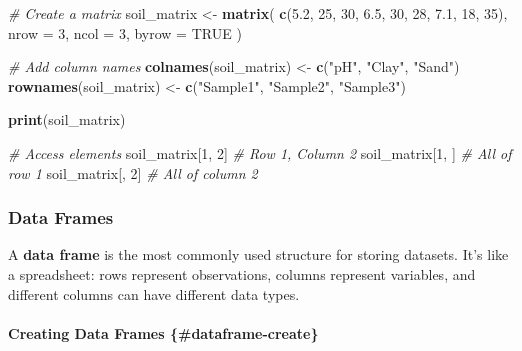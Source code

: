 \documentclass[
  10pt,
  b5paper,
  oneside]{book}
\newenvironment{Shaded}{\begin{snugshade}}{\end{snugshade}}
\newcommand{\AttributeTok}[1]{\textcolor[rgb]{0.13,0.29,0.53}{#1}}
\newcommand{\CommentTok}[1]{\textcolor[rgb]{0.56,0.35,0.01}{\textit{#1}}}
\newcommand{\ConstantTok}[1]{\textcolor[rgb]{0.56,0.35,0.01}{#1}}
\newcommand{\DecValTok}[1]{\textcolor[rgb]{0.00,0.00,0.81}{#1}}
\newcommand{\FloatTok}[1]{\textcolor[rgb]{0.00,0.00,0.81}{#1}}
\newcommand{\FunctionTok}[1]{\textcolor[rgb]{0.13,0.29,0.53}{\textbf{#1}}}
\newcommand{\NormalTok}[1]{#1}
\newcommand{\OtherTok}[1]{\textcolor[rgb]{0.56,0.35,0.01}{#1}}
\newcommand{\StringTok}[1]{\textcolor[rgb]{0.31,0.60,0.02}{#1}}
\begin{document}
\begin{Shaded}
\begin{Highlighting}[]
\CommentTok{\# Create a matrix}
\NormalTok{soil\_matrix }\OtherTok{\textless{}{-}} \FunctionTok{matrix}\NormalTok{(}
  \FunctionTok{c}\NormalTok{(}\FloatTok{5.2}\NormalTok{, }\DecValTok{25}\NormalTok{, }\DecValTok{30}\NormalTok{,}
    \FloatTok{6.5}\NormalTok{, }\DecValTok{30}\NormalTok{, }\DecValTok{28}\NormalTok{,}
    \FloatTok{7.1}\NormalTok{, }\DecValTok{18}\NormalTok{, }\DecValTok{35}\NormalTok{),}
  \AttributeTok{nrow =} \DecValTok{3}\NormalTok{,}
  \AttributeTok{ncol =} \DecValTok{3}\NormalTok{,}
  \AttributeTok{byrow =} \ConstantTok{TRUE}
\NormalTok{)}

\CommentTok{\# Add column names}
\FunctionTok{colnames}\NormalTok{(soil\_matrix) }\OtherTok{\textless{}{-}} \FunctionTok{c}\NormalTok{(}\StringTok{"pH"}\NormalTok{, }\StringTok{"Clay"}\NormalTok{, }\StringTok{"Sand"}\NormalTok{)}
\FunctionTok{rownames}\NormalTok{(soil\_matrix) }\OtherTok{\textless{}{-}} \FunctionTok{c}\NormalTok{(}\StringTok{"Sample1"}\NormalTok{, }\StringTok{"Sample2"}\NormalTok{, }\StringTok{"Sample3"}\NormalTok{)}

\FunctionTok{print}\NormalTok{(soil\_matrix)}

\CommentTok{\# Access elements}
\NormalTok{soil\_matrix[}\DecValTok{1}\NormalTok{, }\DecValTok{2}\NormalTok{]        }\CommentTok{\# Row 1, Column 2}
\NormalTok{soil\_matrix[}\DecValTok{1}\NormalTok{, ]         }\CommentTok{\# All of row 1}
\NormalTok{soil\_matrix[, }\DecValTok{2}\NormalTok{]         }\CommentTok{\# All of column 2}
\end{Highlighting}
\end{Shaded}

\subsubsection{Data Frames}\label{dataframe}

A \textbf{data frame} is the most commonly used structure for storing datasets.
It's like a spreadsheet: rows represent observations, columns represent variables, and different columns can have different data types.

\paragraph*{Creating Data Frames \{\#dataframe-create\}}\label{creating-data-frames-dataframe-create}
\end{document}
